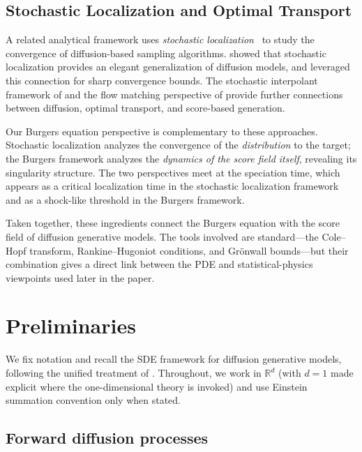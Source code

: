 \documentclass[11pt]{article}
\newcommand{\R}{\mathbb{R}}
\begin{document}
\subsection{Stochastic Localization and Optimal Transport}

A related analytical framework uses \emph{stochastic localization}~\citep{elalaoui2022sampling} to study the convergence of diffusion-based sampling algorithms.
\citet{montanari2023sampling} showed that stochastic localization provides an elegant generalization of diffusion models, and \citet{benton2024nearly} leveraged this connection for sharp convergence bounds.
The stochastic interpolant framework of \citet{albergo2023stochastic} and the flow matching perspective of \citet{lipman2023flow, liu2023flow} provide further connections between diffusion, optimal transport, and score-based generation.

Our Burgers equation perspective is complementary to these approaches.
Stochastic localization analyzes the convergence of the \emph{distribution} to the target; the Burgers framework analyzes the \emph{dynamics of the score field itself}, revealing its singularity structure.
The two perspectives meet at the speciation time, which appears as a critical localization time in the stochastic localization framework and as a shock-like threshold in the Burgers framework.


\bigskip
\noindent
Taken together, these ingredients connect the Burgers equation with the score field of diffusion generative models. The tools involved are standard---the Cole--Hopf transform, Rankine--Hugoniot conditions, and Gr\"onwall bounds---but their combination gives a direct link between the PDE and statistical-physics viewpoints used later in the paper.


\section{Preliminaries}\label{sec:prelim}

We fix notation and recall the SDE framework for diffusion generative models, following the unified treatment of \citet{song2021score}.
Throughout, we work in $\R^d$ (with $d=1$ made explicit where the one-dimensional theory is invoked) and use Einstein summation convention only when stated.

\subsection{Forward diffusion processes}\label{sec:prelim:forward}
\end{document}
